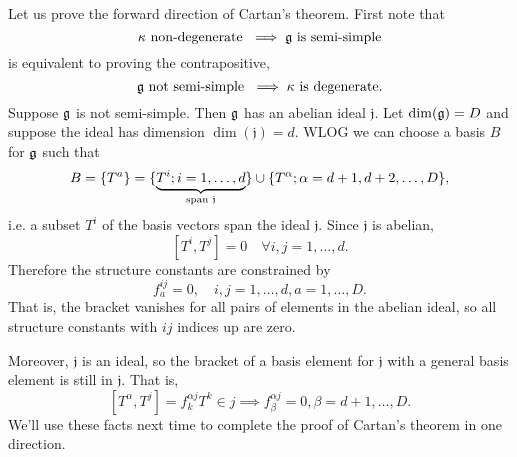 Let us prove the forward direction of Cartan's theorem. First note that $$\kappa\text{ non-degenerate }\implies \mathfrak{g}\text{ is semi-simple}$$ is equivalent to proving the contrapositive, 
$$\mathfrak{g}\text{ not semi-simple }\implies \kappa\text{ is degenerate}.$$
Suppose $\mathfrak{g}$ is not semi-simple. Then $\mathfrak{g}$ has an abelian ideal $\mathfrak{j}.$ Let $\dim(\mathfrak{g})=D$ and suppose the ideal has dimension $\dim(\mathfrak{j})=d.$ WLOG we can choose a basis $B$ for $\mathfrak{g}$ such that
$$B=\{T^a\} =\{\underbrace{T^i; i=1,\ldots,d}_{\text{span }\mathfrak{j}}\}\cup \{T^\alpha;\alpha=d+1,d+2,\ldots, D\},$$
i.e. a subset $T^i$ of the basis vectors span the ideal $\mathfrak{j}.$ Since $\mathfrak{j}$ is abelian,
$$[T^i,T^j]=0\quad\forall i,j=1,\ldots,d.$$ Therefore the structure constants are constrained by
$$f^{ij}_a = 0,\quad i,j=1,\ldots, d, a=1,\ldots,D.$$
That is, the bracket vanishes for all pairs of elements in the abelian ideal, so all structure constants with $ij$ indices up are zero.

Moreover, $\mathfrak{j}$ is an ideal, so the bracket of a basis element for $\mathfrak{j}$ with a general basis element is still in $\mathfrak{j}.$ That is,
$$[T^\alpha,T^j]=f^{\alpha j}_k T^k \in j \implies f^{\alpha j}_\beta=0, \beta = d+1,\ldots,D.$$
We'll use these facts next time to complete the proof of Cartan's theorem in one direction.